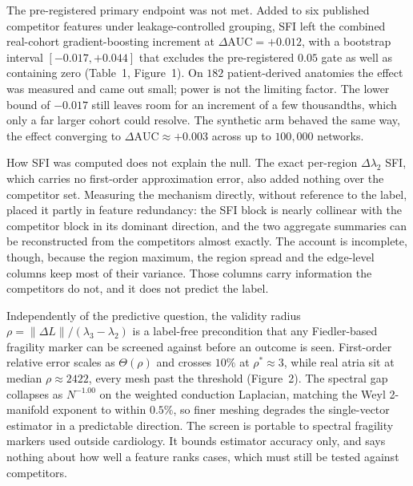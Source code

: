 \documentclass[11pt]{article}
\newcommand{\lam}{\lambda}
\newcommand{\rhoval}{\rho}
\newcommand{\dAUC}{\ensuremath{\Delta\mathrm{AUC}}}
\begin{document}
The pre-registered primary endpoint was not met. Added to six published
competitor features under leakage-controlled grouping, SFI left the combined
real-cohort gradient-boosting increment at $\dAUC=+0.012$, with a bootstrap
interval $[-0.017,+0.044]$ that excludes the pre-registered $0.05$ gate as well
as containing zero (Table~1, Figure~1). On $182$ patient-derived anatomies the
effect was measured and came out small; power is not the limiting factor. The
lower bound of $-0.017$ still leaves room for an increment of a few thousandths,
which only a far larger cohort could resolve. The synthetic arm behaved the same way, the effect converging
to $\dAUC\approx+0.003$ across up to $100{,}000$ networks.

How SFI was computed does not explain the null. The exact per-region $\Delta\lam_2$
SFI, which carries no first-order approximation error, also added nothing over
the competitor set. Measuring the mechanism directly, without reference to the
label, placed it partly in feature redundancy: the SFI block is nearly collinear
with the competitor block in its dominant direction, and the two aggregate
summaries can be reconstructed from the competitors almost exactly. The account
is incomplete, though, because the region maximum, the region spread and the
edge-level columns keep most of their variance. Those columns carry information
the competitors do not, and it does not predict the label.

Independently of the predictive question, the validity radius
$\rhoval=\lVert\Delta L\rVert/(\lam_3-\lam_2)$ is a label-free precondition that
any Fiedler-based fragility marker can be screened against before an outcome is
seen. First-order relative error scales as $\Theta(\rhoval)$ and crosses $10\%$
at $\rhoval^\ast\approx3$, while real atria sit at median $\rhoval\approx2422$,
every mesh past the threshold (Figure~2). The spectral gap collapses as
$N^{-1.00}$ on the weighted conduction Laplacian, matching the Weyl 2-manifold
exponent to within $0.5\%$, so finer meshing degrades the single-vector
estimator in a predictable direction. The screen is portable to spectral
fragility markers used outside cardiology. It bounds estimator accuracy only,
and says nothing about how well a feature ranks cases, which must still be
tested against competitors.
\end{document}
